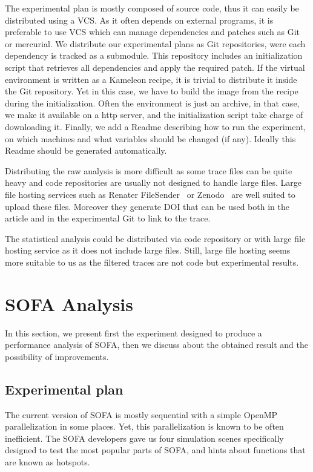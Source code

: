 The experimental plan is mostly composed of source code, thus it can easily be distributed using a \gls{VCS}.
As it often depends on external programs, it is preferable to use \gls{VCS} which can manage dependencies and patches such as \gls{Git} or mercurial.
We distribute our experimental plans as \gls{Git} repositories, were each dependency is tracked as a submodule.
This repository includes an initialization script that retrieves all dependencies and apply the required patch.
If the virtual environment is written as a \gls{Kameleon} recipe, it is trivial to distribute it inside the \gls{Git} repository.
Yet in this case, we have to build the image from the recipe during the initialization.
Often the environment is just an archive, in that case, we make it available on a http server, and the initialization script take charge of downloading it.
Finally, we add a Readme describing how to run the experiment, on which machines and what variables should be changed (if any).
Ideally this Readme should be generated automatically.

Distributing the raw analysis is more difficult as some trace files can be quite heavy and code repositories are usually not designed to handle large files.
Large file hosting services such as Renater FileSender~\cite{RenaterFileSender} or Zenodo~\cite{CernZenodo} are well suited to upload these files.
Moreover they generate \gls{DOI} that can be used both in the article and in the experimental \gls{Git} to link to the trace.

The statistical analysis could be distributed via code repository or with large file hosting service as it does not include large files.
Still, large file hosting seems more suitable to us as the filtered traces are not code but experimental results.

\section{SOFA Analysis}
\label{sec:sofa-analysis}

In this section, we present first the experiment designed to produce a performance analysis of \gls{SOFA}, then we discuss about the obtained result and the possibility of improvements.

\subsection{Experimental plan}

The current version of \gls{SOFA} is mostly sequential with a simple \gls{OpenMP} parallelization in some places.
Yet, this parallelization is known to be often inefficient.
The \gls{SOFA} developers gave us four simulation scenes specifically designed to test the most popular parts of \gls{SOFA}, and hints about functions that are known as hotspots.

